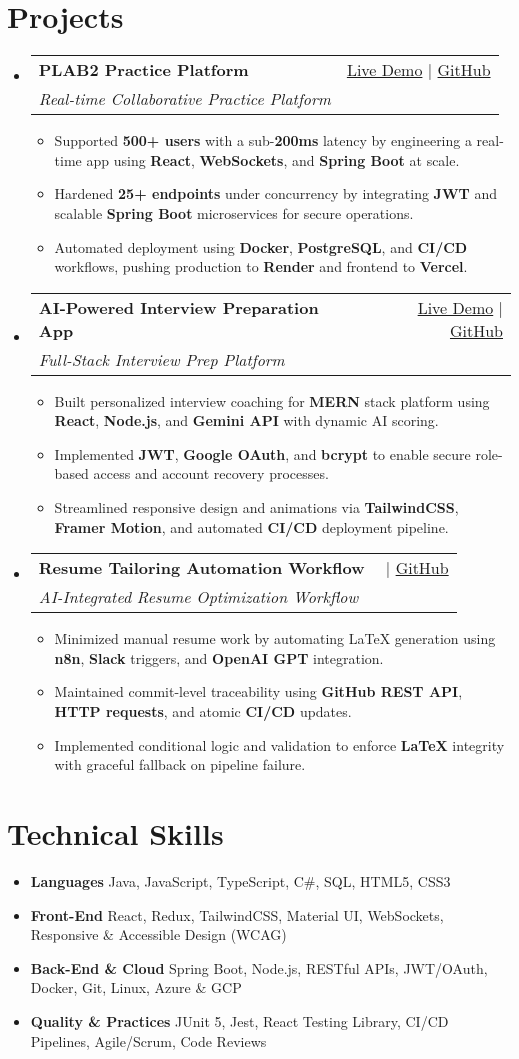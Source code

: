 \documentclass[letterpaper,11pt]{article}
\makeatletter
\newcommand{\resumeItem}[1]{\item\small{#1 \vspace{-2pt}}}
\newcommand{\resumeSubheading}[4]{
  \vspace{-1pt}\item
    \begin{tabular*}{0.97\textwidth}[t]{l@{\extracolsep{\fill}}r}
      \textbf{#1} & #2 \\
      \textit{\small#3} & \textit{\small #4} \\
    \end{tabular*}\vspace{-5pt}
}
\newcommand{\resumeSubHeadingListStart}{\begin{itemize}[leftmargin=*]}
\newcommand{\resumeSubHeadingListEnd}{\end{itemize}}
\newcommand{\resumeItemListStart}{\begin{itemize}}
\newcommand{\resumeItemListEnd}{\end{itemize}\vspace{-5pt}}
\makeatother
\begin{document}
\section{Projects}
  \resumeSubHeadingListStart
    \resumeSubheading
      {\textbf{PLAB2 Practice Platform}}{\href{https://plab2practice.com}{Live Demo} | \href{https://github.com/altansaid/plab2projectnew}{GitHub}}
      {Real-time Collaborative Practice Platform}{}
      \resumeItemListStart
        \resumeItem{Supported \textbf{500+ users} with a sub-\textbf{200ms} latency by engineering a real-time app using \textbf{React}, \textbf{WebSockets}, and \textbf{Spring Boot} at scale.}
        \resumeItem{Hardened \textbf{25+ endpoints} under concurrency by integrating \textbf{JWT} and scalable \textbf{Spring Boot} microservices for secure operations.}
        \resumeItem{Automated deployment using \textbf{Docker}, \textbf{PostgreSQL}, and \textbf{CI/CD} workflows, pushing production to \textbf{Render} and frontend to \textbf{Vercel}.}
      \resumeItemListEnd

    \resumeSubheading
      {\textbf{AI-Powered Interview Preparation App}}{\href{https://interviewcoach-ai.vercel.app}{Live Demo} | \href{https://github.com/altansaid/interviewcoach-ai}{GitHub}}
      {Full-Stack Interview Prep Platform}{}
      \resumeItemListStart
        \resumeItem{Built personalized interview coaching for \textbf{MERN} stack platform using \textbf{React}, \textbf{Node.js}, and \textbf{Gemini API} with dynamic AI scoring.}
        \resumeItem{Implemented \textbf{JWT}, \textbf{Google OAuth}, and \textbf{bcrypt} to enable secure role-based access and account recovery processes.}
        \resumeItem{Streamlined responsive design and animations via \textbf{TailwindCSS}, \textbf{Framer Motion}, and automated \textbf{CI/CD} deployment pipeline.}
      \resumeItemListEnd

    \resumeSubheading
      {\textbf{Resume Tailoring Automation Workflow}}{\href{}{​} | \href{https://github.com/altansaid/resume-updates}{GitHub}}
      {AI-Integrated Resume Optimization Workflow}{}
      \resumeItemListStart
        \resumeItem{Minimized manual resume work by automating LaTeX generation using \textbf{n8n}, \textbf{Slack} triggers, and \textbf{OpenAI GPT} integration.}
        \resumeItem{Maintained commit-level traceability using \textbf{GitHub REST API}, \textbf{HTTP requests}, and atomic \textbf{CI/CD} updates.}
        \resumeItem{Implemented conditional logic and validation to enforce \textbf{LaTeX} integrity with graceful fallback on pipeline failure.}
      \resumeItemListEnd
  \resumeSubHeadingListEnd

\section{Technical Skills}
  \resumeItemListStart
    \resumeItem{\textbf{Languages}}{Java, JavaScript, TypeScript, C\#, SQL, HTML5, CSS3}
    \resumeItem{\textbf{Front-End}}{React, Redux, TailwindCSS, Material UI, WebSockets, Responsive \& Accessible Design (WCAG)}
    \resumeItem{\textbf{Back-End \& Cloud}}{Spring Boot, Node.js, RESTful APIs, JWT/OAuth, Docker, Git, Linux, Azure \& GCP}
    \resumeItem{\textbf{Quality \& Practices}}{JUnit 5, Jest, React Testing Library, CI/CD Pipelines, Agile/Scrum, Code Reviews}
  \resumeItemListEnd
\end{document}
